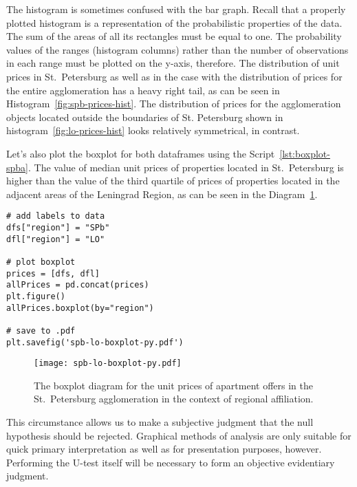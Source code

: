 \documentclass[]{scrreprt}
\begin{document}
The histogram is sometimes confused with the bar graph. Recall that a properly plotted histogram is a representation of the probabilistic properties of the data. The sum of the areas of all its rectangles must be equal to one. The probability values of the ranges (histogram columns) rather than the number of observations in each range must be plotted on the y-axis, therefore. The distribution of unit prices in St.~Petersburg as well as in the case with the distribution of prices for the entire agglomeration has a heavy right tail, as can be seen in Histogram~\ref{fig:spb-prices-hist}. The distribution of prices for the agglomeration objects located outside the boundaries of St. Petersburg shown in histogram~\ref{fig:lo-prices-hist} looks relatively symmetrical, in contrast.

Let's also plot the boxplot for both dataframes using the Script~\ref{lst:boxplot-spba}. The value of median unit prices of properties located in St.~Petersburg is higher than the value of the third quartile of prices of properties located in the adjacent areas of the Leningrad Region, as can be seen in the Diagram~\ref{fig:spb-lo-boxplot-py}.
%
\begin{lstlisting}[float=htp, caption = Plotting the boxplot for both subsamples, firstnumber=1, label= lst:boxplot-spba]
# add labels to data
dfs["region"] = "SPb"
dfl["region"] = "LO"

# plot boxplot
prices = [dfs, dfl]
allPrices = pd.concat(prices)
plt.figure()
allPrices.boxplot(by="region")

# save to .pdf
plt.savefig('spb-lo-boxplot-py.pdf')
\end{lstlisting} 
%
\begin{figure}[htp]
	\centering
	\texttt{[image: spb-lo-boxplot-py.pdf]}
	\caption{The boxplot diagram for the unit prices of apartment offers in the St.~Petersburg agglomeration in the context of regional affiliation.}
	\label{fig:spb-lo-boxplot-py}
\end{figure}

This circumstance allows us to make a subjective judgment that the null hypothesis should be rejected. Graphical methods of analysis are only suitable for quick primary interpretation as well as for presentation purposes, however. Performing the U-test itself will be necessary to form an objective evidentiary judgment.
\end{document}
